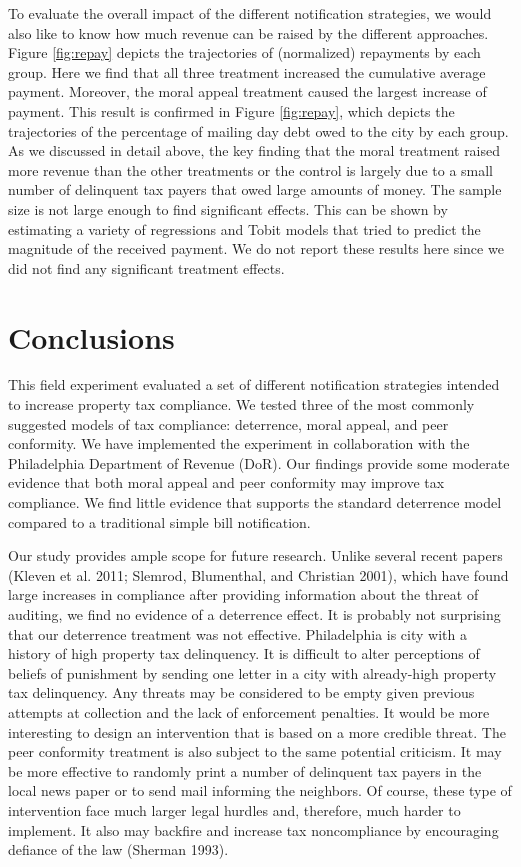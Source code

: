 \documentclass[12pt,titlepage]{article}
\begin{document}
To evaluate the overall impact of the different notification
strategies, we would also like to know how much revenue can be raised
by the different approaches.  Figure \ref{fig:repay} depicts the
trajectories of (normalized) repayments by each group.  Here we find
that all three treatment increased the cumulative average payment.
Moreover, the moral appeal treatment caused the largest increase of
payment.  This result is confirmed in Figure \ref{fig:repay}, which
depicts the trajectories of the percentage of mailing day debt owed to
the city by each group. As we discussed in detail above, the key
finding that the moral treatment raised more revenue than the other
treatments or the control is largely due to a small number of
delinquent tax payers that owed large amounts of money.  The sample
size is not large enough to find significant effects. This can be
shown by estimating a variety of regressions and Tobit models that
tried to predict the magnitude of the received payment. We do not
report these results here since we did not find any significant
treatment effects.


\section{Conclusions}

This field experiment evaluated a set of different notification
strategies intended to increase property tax compliance. We tested
three of the most commonly suggested models of tax compliance:
deterrence, moral appeal, and peer conformity.  We have implemented
the experiment in collaboration with the Philadelphia Department of
Revenue (DoR).  Our findings provide some moderate evidence that
both moral appeal and peer conformity may improve tax compliance. We
find little evidence that supports the standard deterrence model
compared to a traditional simple bill notification.

Our study provides ample scope for future research.  Unlike several
recent papers (Kleven et al. 2011; Slemrod, Blumenthal, and Christian
2001), which have found large increases in compliance after providing
information about the threat of auditing, we find no evidence of a
deterrence effect.  It is probably not surprising that our deterrence
treatment was not effective. Philadelphia is city with a history of
high property tax delinquency. It is difficult to alter perceptions of
beliefs of punishment by sending one letter in a city with
already-high property tax delinquency.  Any threats may be considered
to be empty given previous attempts at collection and the lack of
enforcement penalties.  It would be more interesting to design an
intervention that is based on a more credible threat.  The peer
conformity treatment is also subject to the same potential
criticism. It may be more effective to randomly print a number of
delinquent tax payers in the local news paper or to send mail
informing the neighbors. Of course, these type of intervention face
much larger legal hurdles and, therefore, much harder to implement.
It also may backfire and increase tax noncompliance by encouraging
defiance of the law (Sherman 1993).
\end{document}
